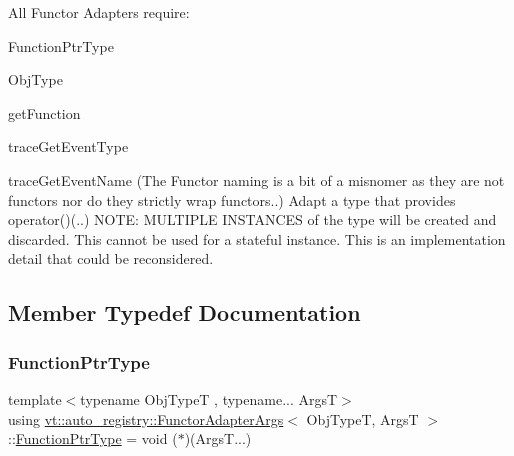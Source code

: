 All Functor Adapters require\+:
\begin{DoxyItemize}
\item Function\+Ptr\+Type
\item Obj\+Type
\item get\+Function
\item trace\+Get\+Event\+Type
\item trace\+Get\+Event\+Name (The \textquotesingle{}Functor\textquotesingle{} naming is a bit of a misnomer as they are not functors nor do they strictly wrap functors..) Adapt a type that provides operator()(..) N\+O\+TE\+: M\+U\+L\+T\+I\+P\+LE I\+N\+S\+T\+A\+N\+C\+ES of the type will be created and discarded. This cannot be used for a stateful instance. This is an implementation detail that could be reconsidered. 
\end{DoxyItemize}

\subsection{Member Typedef Documentation}
\mbox{\label{structvt_1_1auto__registry_1_1_functor_adapter_args_a8845389dd3d7c6686f20764a077d1337}} 
\subsubsection{\texorpdfstring{Function\+Ptr\+Type}{FunctionPtrType}}
{\footnotesize\ttfamily template$<$typename Obj\+TypeT , typename... ArgsT$>$ \\
using \hyperlink{structvt_1_1auto__registry_1_1_functor_adapter_args}{vt\+::auto\+\_\+registry\+::\+Functor\+Adapter\+Args}$<$ Obj\+TypeT, ArgsT $>$\+::\hyperlink{structvt_1_1auto__registry_1_1_functor_adapter_args_a8845389dd3d7c6686f20764a077d1337}{Function\+Ptr\+Type} =  void ($\ast$)(Args\+T...)}

\mbox{\label{structvt_1_1auto__registry_1_1_functor_adapter_args_ad081c757043c3f9a340c09e1d66822fa}} 
